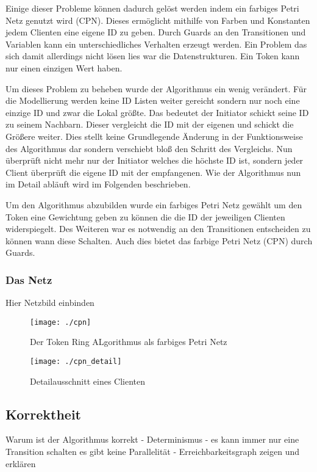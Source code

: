 Einige dieser Probleme können dadurch gelöst werden indem ein farbiges Petri Netz genutzt wird (CPN). Dieses ermöglicht mithilfe von Farben und Konstanten jedem Clienten eine eigene ID zu geben. Durch Guards an den Transitionen und Variablen kann ein unterschiedliches Verhalten erzeugt werden. Ein Problem das sich damit allerdings nicht lösen lies war die Datenstrukturen. Ein Token kann nur einen einzigen Wert haben.

Um dieses Problem zu beheben wurde der Algorithmus ein wenig verändert. Für die Modellierung werden keine ID Listen weiter gereicht sondern nur noch eine einzige ID und zwar die Lokal größte. Das bedeutet der Initiator schickt seine ID zu seinem Nachbarn. Dieser vergleicht die ID mit der eigenen und schickt die Größere weiter. Dies stellt keine Grundlegende Änderung in der Funktionsweise des Algorithmus dar sondern verschiebt bloß den Schritt des Vergleichs. Nun überprüft nicht mehr nur der Initiator welches die höchste ID ist, sondern jeder Client überprüft die eigene ID mit der empfangenen. Wie der Algorithmus nun im Detail abläuft wird im Folgenden beschrieben.

Um den Algorithmus abzubilden wurde ein farbiges Petri Netz gewählt um den Token eine Gewichtung geben zu können die die ID der jeweiligen Clienten widerspiegelt. Des Weiteren war es notwendig an den Transitionen entscheiden zu können wann diese Schalten. Auch dies bietet das farbige Petri Netz (CPN) durch Guards.


\subsubsection{Das Netz}
Hier Netzbild einbinden
\begin{figure}[H]
\centering
\texttt{[image: ./cpn]}
\caption{Der Token Ring ALgorithmus als farbiges Petri Netz}
\label{fig:cpn}
\end{figure}

\begin{figure}[H]
\centering
\texttt{[image: ./cpn\_detail]}
\caption{Detailausschnitt eines Clienten}
\label{fig:cpn_detail}
\end{figure}



\subsection{Korrektheit}
Warum ist der Algorithmus korrekt
- Determinismus
- es kann immer nur eine Transition schalten es gibt keine Parallelität
- Erreichbarkeitsgraph zeigen und erklären
